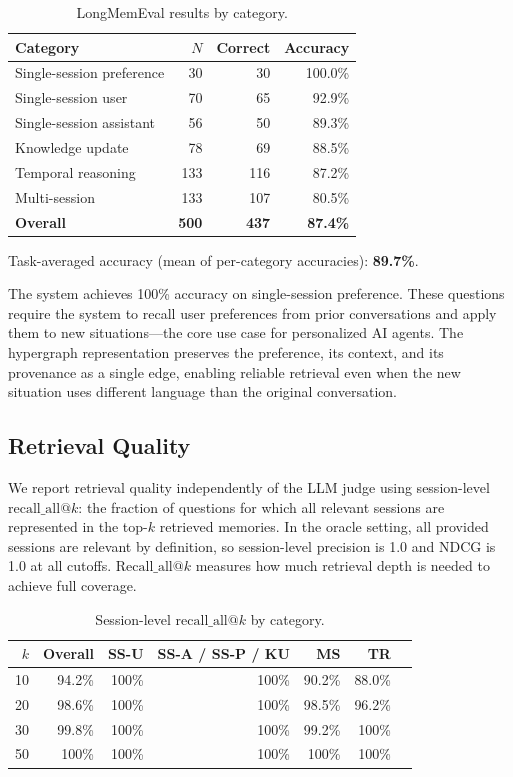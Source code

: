 \documentclass[11pt,a4paper]{article}
\begin{document}
\begin{table}[h]
\centering
\caption{LongMemEval results by category.}
\label{tab:results}
\begin{tabular}{@{}lrrr@{}}
\toprule
Category & $N$ & Correct & Accuracy \\
\midrule
Single-session preference  & 30  & 30  & 100.0\% \\
Single-session user        & 70  & 65  & 92.9\%  \\
Single-session assistant   & 56  & 50  & 89.3\%  \\
Knowledge update           & 78  & 69  & 88.5\%  \\
Temporal reasoning         & 133 & 116 & 87.2\%  \\
Multi-session              & 133 & 107 & 80.5\%  \\
\midrule
\textbf{Overall}           & \textbf{500} & \textbf{437} & \textbf{87.4\%} \\
\bottomrule
\end{tabular}
\end{table}

Task-averaged accuracy (mean of per-category accuracies): \textbf{89.7\%}.

The system achieves 100\% accuracy on single-session preference. These questions require the system to recall user preferences from prior conversations and apply them to new situations---the core use case for personalized AI agents. The hypergraph representation preserves the preference, its context, and its provenance as a single edge, enabling reliable retrieval even when the new situation uses different language than the original conversation.

\subsection{Retrieval Quality}

We report retrieval quality independently of the LLM judge using session-level $\text{recall\_all}@k$: the fraction of questions for which all relevant sessions are represented in the top-$k$ retrieved memories. In the oracle setting, all provided sessions are relevant by definition, so session-level precision is 1.0 and NDCG is 1.0 at all cutoffs. $\text{Recall\_all}@k$ measures how much retrieval depth is needed to achieve full coverage.

\begin{table}[h]
\centering
\caption{Session-level $\text{recall\_all}@k$ by category.}
\label{tab:recall-at-k}
\begin{tabular}{@{}rrrrrrr@{}}
\toprule
$k$ & Overall & SS-U & SS-A / SS-P / KU & MS & TR \\
\midrule
10 & 94.2\% & 100\% & 100\% & 90.2\% & 88.0\% \\
20 & 98.6\% & 100\% & 100\% & 98.5\% & 96.2\% \\
30 & 99.8\% & 100\% & 100\% & 99.2\% & 100\%  \\
50 & 100\%  & 100\% & 100\% & 100\%  & 100\%  \\
\bottomrule
\end{tabular}
\end{table}
\end{document}
